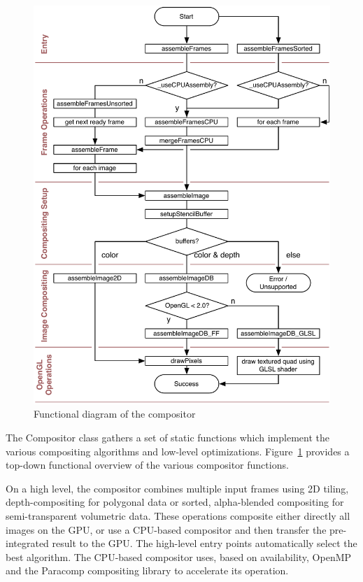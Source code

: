 \documentclass[10pt,a4]{scrartcl}
\newcommand{\fig}[1]{Figure~\ref{#1}}
\begin{document}
\begin{figure}[h!t]\center
  \includegraphics[width=.9\textwidth]{images/compositor.pdf}
  {\caption{\label{fCompositor}Functional diagram of the compositor}}
\end{figure}
The \textsf{Compositor} class gathers a set of static functions which
implement the various compositing algorithms and low-level
optimizations. \fig{fCompositor} provides a top-down functional overview
of the various compositor functions.

On a high level, the compositor combines multiple input frames using 2D
tiling, depth-compositing for polygonal data or sorted, alpha-blended
compositing for semi-transparent volumetric data. These operations
composite either directly all images on the GPU, or use a CPU-based
compositor and then transfer the pre-integrated result to the GPU. The
high-level entry points automatically select the best algorithm. The
CPU-based compositor uses, based on availability, OpenMP and the
Paracomp compositing library to accelerate its operation.
\end{document}
